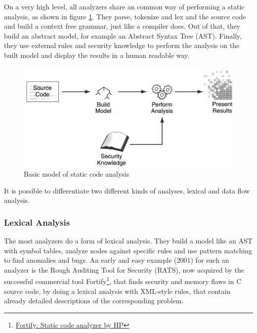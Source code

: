 \documentclass[conference]{IEEEtran}
\begin{document}
On a very high level, all analyzers share an common way of performing a static analysis, as shown in figure \ref{fig:analysis}.
They parse, tokenize and lex and the source code and build a context free grammar, just like a compiler does.
Out of that, they build an abstract model, for example an Abstract Syntax Tree (AST).
Finally, they use external rules and security knowledge to perform the analysis on the built model and display the results in a human readable way.

\begin{figure}[!t]
	\centering
	\includegraphics[width=1\linewidth]{img/analysis.png}
	\caption{Basic model of static code analysis \cite{Static_code_analysis_book_Chess:2007}}
	\label{fig:analysis}
\end{figure}

It is possible to differentiate two different kinds of analyses, lexical and data flow analysis.


\subsubsection{Lexical Analysis}
\label{subsubsec:lex_analysis}
The most analyzers do a form of lexical analysis.
They build a model like an AST with symbol tables, analyze nodes against specific rules and use pattern matching to find anomalies and bugs.
An early and easy example (2001) for such an analyzer is the Rough Auditing Tool for Security (RATS)\cite{Static_code_analysis_book_Chess:2007}, now acquired by the successful commercial tool Fortify\footnote{\href{http://www8.hp.com/de/de/software-solutions/application-security/}{Fortify: Static code analyzer by HP}}, that finds security and memory flaws in C source code, by doing a lexical analysis with XML-style rules, that contain already detailed descriptions of the corresponding problem.
\end{document}
